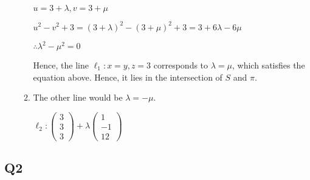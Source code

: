 \documentclass{article}
\begin{document}
\begin{enumerate}[label=(\alph*)]
\begin{enumerate}[label=(\roman*)]
$u=3 + \lambda, v = 3+\mu$

$u^2 - v^2 + 3 = (3 + \lambda)^2 - (3+\mu)^2 + 3 = 3 + 6\lambda - 6\mu$

$\therefore \lambda^2 - \mu^2 = 0$

Hence, the line $\ell_1: x=y,z=3$ corresponds to $\lambda=\mu$, which satisfies the equation above. Hence, it lies in the intersection of $S$ and $\pi$.

\item
The other line would be $\lambda = -\mu$.

$\ell_2: \begin{pmatrix}
3\\3\\3
\end{pmatrix} + \lambda\begin{pmatrix}
1\\-1\\12
\end{pmatrix}$
\end{enumerate}

\end{enumerate}

\subsection*{Q2}
\end{document}

